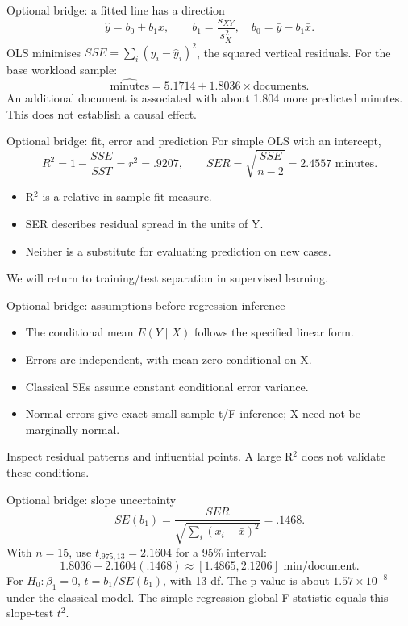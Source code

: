 \begin{frame}{Optional bridge: a fitted line has a direction}
\[
\widehat y=b_0+b_1x,\qquad b_1=\frac{s_{XY}}{s_X^2},\quad b_0=\bar y-b_1\bar x.
\]
OLS minimises $SSE=\sum_i(y_i-\widehat y_i)^2$, the squared vertical residuals.
For the base workload sample:
\[
\widehat{\text{minutes}}=5.1714+1.8036\times\text{documents}.
\]
An additional document is associated with about 1.804 more predicted minutes. This does not establish a causal effect.
\end{frame}
\begin{frame}{Optional bridge: fit, error and prediction}
For simple OLS with an intercept,
\[
R^2=1-\frac{SSE}{SST}=r^2=.9207,\qquad
SER=\sqrt{\frac{SSE}{n-2}}=2.4557\text{ minutes}.
\]
\begin{itemize}\item R$^2$ is a relative in-sample fit measure.\item SER describes residual spread in the units of Y.\item Neither is a substitute for evaluating prediction on new cases.\end{itemize}
We will return to training/test separation in supervised learning.
\end{frame}
\begin{frame}{Optional bridge: assumptions before regression inference}
\begin{itemize}
\item The conditional mean $E(Y\mid X)$ follows the specified linear form.
\item Errors are independent, with mean zero conditional on X.
\item Classical SEs assume constant conditional error variance.
\item Normal errors give exact small-sample t/F inference; X need not be marginally normal.
\end{itemize}Inspect residual patterns and influential points. A large R$^2$ does not validate these conditions.
\end{frame}
\begin{frame}{Optional bridge: slope uncertainty}
\[
SE(b_1)=\frac{SER}{\sqrt{\sum_i(x_i-\bar x)^2}}=.1468.
\]
With $n=15$, use $t_{.975,13}=2.1604$ for a 95\% interval:
\[
1.8036\pm2.1604(.1468)\approx[1.4865,2.1206]\text{ min/document}.
\]
For $H_0:\beta_1=0$, $t=b_1/SE(b_1)$, with 13 df. The p-value is about $1.57\times10^{-8}$ under the classical model.
The simple-regression global F statistic equals this slope-test $t^2$.
\end{frame}
